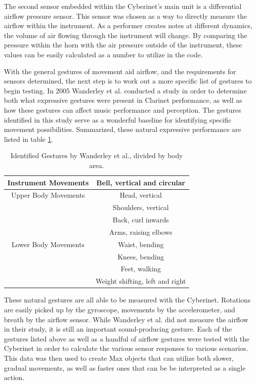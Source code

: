 The second sensor embedded within the Cyberinet's main unit is a differential airflow pressure sensor. This sensor was chosen as a way to directly measure the airflow within the instrument. As a performer creates notes at different dynamics, the volume of air flowing through the instrument will change. By comparing the pressure within the horn with the air pressure outside of the instrument, these values can be easily calculated as a number to utilize in the code. 

With the general gestures of movement aid airflow, and the requirements for sensors determined, the next step is to work out a more specific list of gestures to begin testing. In 2005 Wanderley et al. conducted a study in order to determine both what expressive gestures were present in Clarinet performance, as well as how these gestures can affect music performance and perception\cite{wanderleyClarinetGesture2005}. The gestures identified in this study serve as a wonderful baseline for identifying specific movement possibilities. Summarized, these natural expressive performance are listed in table \ref{tab:generalGestures}.

\begin{table}[]
    \centering
    \begin{tabular}{|c||c|}
    \hline
       Instrument Movements  & Bell, vertical and circular \\
       \hline
        Upper Body Movements & Head, vertical \\
        & Shoulders, vertical \\
        & Back, curl inwards \\
        & Arms, raising elbows \\
        \hline
        Lower Body Movements & Waist, bending \\
        & Knees, bending \\
        & Feet, walking \\
        & Weight shifting, left and right\\
        \hline
    \end{tabular}
    \caption{Identified Gestures by Wanderley et al.\cite{wanderleyClarinetGesture2005}, divided by body area.}
    \label{tab:generalGestures}
\end{table}

These natural gestures are all able to be measured with the Cyberinet. Rotations are easily picked up by the gyroscope, movements by the accelerometer, and breath by the airflow sensor. While Wanderley et al. did not measure the airflow in their study, it is still an important sound-producing gesture\cite{miranda_Wanderley_instrumentControl_2006}. Each of the gestures listed above as well as a handful of airflow gestures were tested with the Cyberinet in order to calculate the various sensor responses to various scenarios. This data was then used to create Max objects that can utilize both slower, gradual movements, as well as faster ones that can be be interpreted as a single action.


